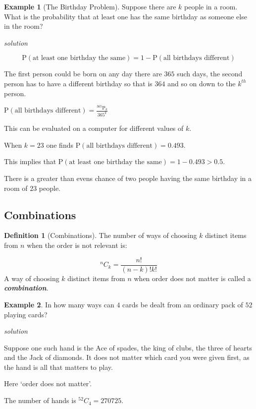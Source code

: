\documentclass[
]{book}
\theoremstyle{definition}
\newtheorem{definition}{Definition}[chapter]
\theoremstyle{definition}
\newtheorem{example}{Example}[chapter]
\theoremstyle{definition}
\theoremstyle{definition}
\theoremstyle{remark}
\begin{document}
\begin{example}[The Birthday Problem]
\protect\hypertarget{exm:birthday}{}\label{exm:birthday}Suppose there are \(k\) people in a room. What is the probability that at least one has the same birthday as someone else in the room?

\emph{solution}

\[\text{P}(\text{at least one birthday the same}) = 1 - \text{P}(\text{all birthdays different})\]

The first person could be born on any day there are \(365\) such days, the second person has to have a different birthday so that is \(364\) and so on down to the \(k^{th}\) person.

\(\text{P}(\text{all birthdays different}) = \frac{^{365}\text{P}_k}{365^k}\)

This can be evaluated on a computer for different values of \(k\).

When \(k=23\) one finds \(\text{P}(\text{all birthdays different}) = 0.493\).

This implies that \(\text{P}(\text{at least one birthday the same}) = 1- 0.493 > 0.5\).

There is a greater than evens chance of two people having the same birthday in a room of \(23\) people.
\end{example}

\hypertarget{combinations}{%
\subsection{Combinations}\label{combinations}}

\begin{definition}[Combinations]
\protect\hypertarget{def:comb}{}\label{def:comb}The number of ways of choosing \(k\) distinct items from \(n\) when the order is not relevant is:

\[^nC_k = \frac{n!}{(n-k)!k!}\]
A way of choosing \(k\) distinct items from \(n\) when order does not matter is called a \textbf{\emph{combination}}.
\end{definition}

\begin{example}
In how many ways can \(4\) cards be dealt from an ordinary pack of \(52\) playing cards?

\emph{solution}

Suppose one such hand is the Ace of spades, the king of clubs, the three of hearts and the Jack of diamonds. It does not matter which card you were given first, as the hand is all that matters to play.

Here `order does not matter'.

The number of hands is \(^{52}C_{4}=270725\).
\end{example}
\end{document}

